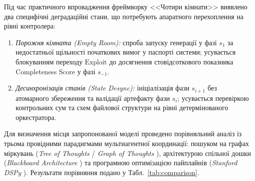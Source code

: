 \documentclass[12pt, reqno, a4paper]{amsart}
\theoremstyle{definition}
\theoremstyle{plain}
\theoremstyle{plain}
\theoremstyle{plain}
\theoremstyle{remark}
\theoremstyle{plain}
\begin{document}
{Під час практичного впровадження фреймворку <<Чотири кімнати>> виявлено два специфічні деградаційні стани, що потребують апаратного перехоплення на рівні контролера:
\begin{enumerate}
\item \textit{Порожня кімната (Empty Room):} спроба запуску генерації у фазі $s_1$ за недостатньої щільності початкових вимог у паспорті системи; усувається блокуванням переходу $\text{Exploit}$ до досягнення стовідсоткового показника Completeness Score у фазі $s_{-1}$.
\item \textit{Десинхронізація станів (State Desync):} ініціалізація фази $s_{i+1}$ без атомарного збереження та валідації артефакту фази $s_i$; усувається перевіркою контрольних сум та схем файлової структури на рівні детермінованого оркестратора.
\end{enumerate}

Для визначення місця запропонованої моделі проведено порівняльний аналіз із трьома провідними парадигмами мультиагентної координації: пошуком на графах міркувань (\textit{Tree of Thoughts} \cite{bib17} / \textit{Graph of Thoughts} \cite{bib10}), архітектурою спільної дошки (\textit{Blackboard Architecture} \cite{bib18}) та програмною оптимізацією пайплайнів (\textit{Stanford DSPy} \cite{bib16}). Результати порівняння подано у Табл.~\ref{tab:comparison}.

}
\end{document}
